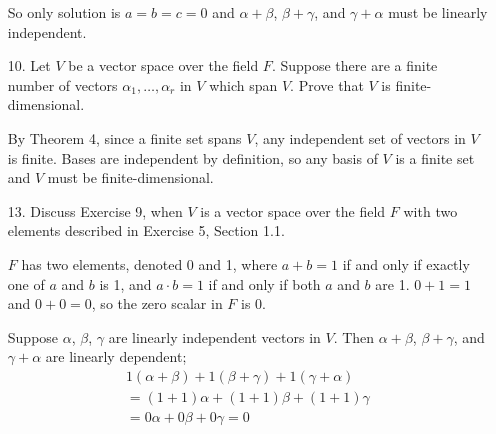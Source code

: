 \documentclass{article}
\begin{document}
\begin{enumerate}[listparindent=\parindent]
    So only solution is \(a = b = c = 0\) and \(\alpha + \beta\), \(\beta + \gamma\), and \(\gamma + \alpha\) must be linearly independent.

\item[10.] Let \(V\) be a vector space over the field \(F\). Suppose there are a finite number of vectors \(\alpha_1, \dots, \alpha_r\) in \(V\) which span \(V\).
    Prove that \(V\) is finite-dimensional.

    By Theorem 4, since a finite set spans \(V\), any independent set of vectors in \(V\) is finite.
    Bases are independent by definition, so any basis of \(V\) is a finite set and \(V\) must be finite-dimensional.

\item[13.] Discuss Exercise 9, when \(V\) is a vector space over the field \(F\) with two elements described in Exercise 5, Section 1.1.

    \(F\) has two elements, denoted 0 and 1, where \(a + b = 1\) if and only if exactly one of \(a\) and \(b\) is 1, and \(a \cdot b = 1\) if and only if both \(a\) and \(b\) are 1.
    \(0 + 1 = 1\) and \(0 + 0 = 0\), so the zero scalar in \(F\) is 0.

    Suppose \(\alpha\), \(\beta\), \(\gamma\) are linearly independent vectors in \(V\).
    Then \(\alpha + \beta\), \(\beta + \gamma\), and \(\gamma + \alpha\) are linearly dependent;
    \begin{gather*}
    1(\alpha + \beta) + 1(\beta + \gamma) + 1(\gamma + \alpha) \\
    = (1 + 1)\alpha + (1 + 1)\beta + (1 + 1)\gamma \\
    = 0\alpha + 0\beta + 0\gamma
    = 0
    \end{gather*}

\end{enumerate}
\end{document}

